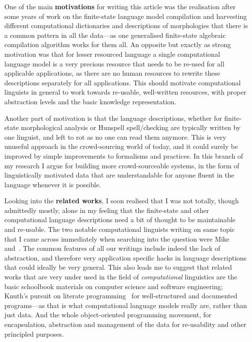 \documentclass[officiallayout]{unihelcompling}
\begin{document}
One of the main \textbf{motivations} for writing this article was the
realisation after some years of work on the finite-state language model
compilation and harvesting different computational dictionaries and
descriptions of morphologies that there is a common pattern in all the
data---as one generalised finite-state algebraic compilation algorithm works
for them all. An opposite but exactly as strong motivation was that for lesser
resourced language a single computational language model is a very precious
resource that needs to be re-used for all applicable applications, as there are
no human resources to rewrite these descriptions separately for all
applications. This should motivate computational linguists in general to work
towards re-usable, well-written resources, with proper abstraction levels and
the basic knowledge representation.

Another part of motivation is that the language descriptions, whether for
finite-state morphological analysis or Hunspell spell\-/checking are typically
written by one linguist, and left to rot as no one can read them anymore.  This
is very unuseful approach in the crowd-sourcing world of today, and it could
surely be improved by simple improvements to formalisms and practices.  In this
branch of my research I argue for building more crowd-sourceable systems, in
the form of linguistically motivated data that are understandable for anyone
fluent in the language whenever it is possible.

Looking into the \textbf{related works}, I soon realised that I was not
totally, though admittedly mostly, alone in my feeling that the finite-state
and other computational language descriptions need a bit of thought to be
maintainable and re-usable. The two notable computational linguists writing on
same topic that I came across immediately when searching into the question were
Mike~\citet{maxwell2008joint} and~\citet{wintner2008strengths}. The
common features of all our writings include indeed the lack of abstraction, and
therefore very application specific hacks in language descriptions that could
ideally be very general. This also leads me to suggest that related works that
are very under used in the field of \emph{computational} linguistics are the
basic schoolbook materials on computer science and software engineering;
Knuth's pursuit on literate programming~\citep{knuth1984literate} for
well-structured and documented programs---as that is what computational
language models really are, rather than just data. And the whole
object-oriented programming movement, for encapsulation, abstraction and
management of the data for re-usability and other principled purposes.
\end{document}
